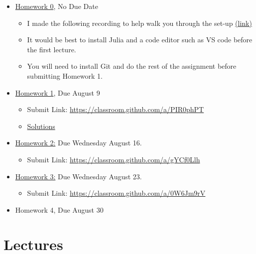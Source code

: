 \documentclass[
]{book}
\providecommand{\tightlist}{%
  \setlength{\itemsep}{0pt}\setlength{\parskip}{0pt}}
\begin{document}
\begin{itemize}
\tightlist
\item
  \href{https://kevinghunt.github.io/ComputationCamp/homeworks/homework0.html}{Homework 0}, No Due Date

  \begin{itemize}
  \tightlist
  \item
    I made the following recording to help walk you through the set-up \href{https://uwmadison.zoom.us/rec/share/SbHWe_IMXFEaNy6ujwbKphJ2r3TgOvHtJqpkHT17NZDpX7cXcMdZhQtfmoC-WGNI.iN1B20YE_uH-QuFT?startTime=1690209565000}{(link)}
  \item
    It would be best to install Julia and a code editor such as VS code before the first lecture.
  \item
    You will need to install Git and do the rest of the assignment before submitting Homework 1.
  \end{itemize}
\item
  \href{https://kevinghunt.github.io/ComputationCamp/homeworks/homework1.html}{Homework 1}, Due August 9

  \begin{itemize}
  \tightlist
  \item
    Submit Link: \url{https://classroom.github.com/a/PIR0phPT}
  \item
    \href{https://kevinghunt.github.io/ComputationCamp/homework_solutions/Homework1_solutions.jl}{Solutions}
  \end{itemize}
\item
  \href{https://kevinghunt.github.io/ComputationCamp/homeworks/homework2.html}{Homework 2:} Due Wednesday August 16.

  \begin{itemize}
  \tightlist
  \item
    Submit Link: \url{https://classroom.github.com/a/gYCf0Llh}
  \end{itemize}
\item
  \href{https://kevinghunt.github.io/ComputationCamp/homeworks/homework3.html}{Homework 3:} Due Wednesday August 23.

  \begin{itemize}
  \tightlist
  \item
    Submit Link: \url{https://classroom.github.com/a/0W6Jm9rV}
  \end{itemize}
\item
  Homework 4, Due August 30
\end{itemize}

\hypertarget{lectures}{%
\chapter{Lectures}\label{lectures}}
\end{document}
